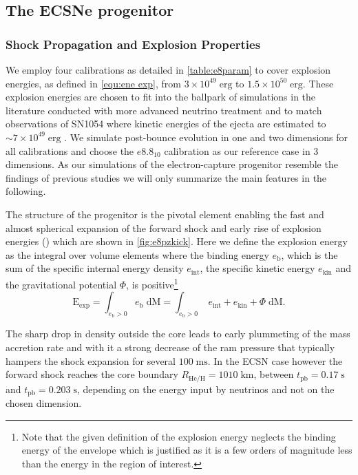 \documentclass[fleqn,usenatbib]{mnras}
\begin{document}
\subsection{The ECSNe progenitor}
\subsubsection{Shock Propagation and Explosion Properties}
\label{sec:explosion ecsn}

We employ four calibrations as detailed in \autoref{table:e8param} to cover explosion energies, as defined in \autoref{equ:ene exp}, from $3\times 10^{49}\;\mathrm{erg}$ to $1.5\times 10^{50}\;\mathrm{erg}$. These explosion energies are chosen to fit into the ballpark of simulations in the literature conducted with more advanced neutrino treatment and to match observations of SN1054 where kinetic energies of the ejecta are estimated to $\sim 7 \times 10^{49}\;\mathrm{erg}$ \cite{Smith2013}. We simulate post-bounce evolution in one and two dimensions for all calibrations and choose the $e8.8_{10}$ calibration as our reference case in 3 dimensions. 
As our simulations of the electron-capture progenitor resemble the findings of previous studies we will only summarize the main features in the following.

The structure of the progenitor is the pivotal element enabling the fast and almost spherical expansion of the forward shock and early rise of explosion energies (\citealt{Kitaura2006,Janka2008,Gessner2018}) which are shown in \autoref{fig:e8pzkick}. 
Here we define the explosion energy as the integral over volume elements where the binding energy $e_\mathrm{b}$, which is the sum of the specific internal energy density $e_{\mathrm{int}}$, the specific kinetic energy $e_{\mathrm{kin}}$ and the gravitational potential $\Phi$, is positive\footnote{Note that the given definition of the explosion energy neglects the binding energy of the envelope which is justified as it is a few orders of magnitude less than the energy in the region of interest.}
\begin{equation}
    \mathrm{E}_{\mathrm{exp}} = \int_{e_{\mathrm{b}} > 0} e_{\mathrm{b}} \; \mathrm{dM} =
    \int_{e_{\mathrm{b}} > 0}\; e_{\mathrm{int}} + e_{\mathrm{kin}} + \Phi \; \mathrm{dM}.
    \label{equ:ene exp}
\end{equation}

The sharp drop in density outside the core leads to early plummeting of the mass accretion rate and with it a strong decrease of the ram pressure that typically hampers the shock expansion for several $100\;\mathrm{ms}$. In the ECSN case however the forward shock reaches the core boundary $R_{\mathrm{He/H}}=1010\;\mathrm{km}$, between $t_{\mathrm{pb}}=0.17\;\mathrm{s}$ and $t_{\mathrm{pb}}=0.203\;\mathrm{s}$, depending on the energy input by neutrinos and not on the chosen dimension.
\end{document}
